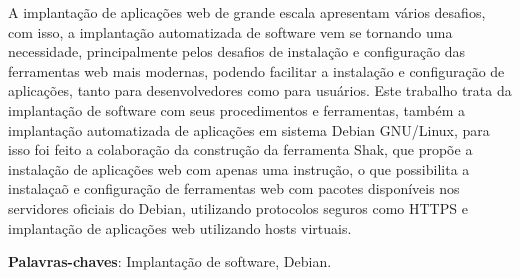 \begin{resumo}

A implantação de aplicações web de grande escala apresentam vários desafios, com
isso, a implantação automatizada de software vem se tornando uma necessidade,
principalmente pelos desafios de instalação e configuração das ferramentas web
mais modernas, podendo facilitar a instalação e configuração de aplicações, tanto para
desenvolvedores como para usuários. Este trabalho trata da implantação de software
com seus procedimentos e ferramentas, também a implantação  automatizada de
aplicações em sistema Debian GNU/Linux, para isso foi feito a colaboração da
construção da ferramenta Shak, que propõe a instalação de aplicações web com
apenas uma instrução, o que possibilita a instalaçaõ e configuração de ferramentas
web com pacotes disponíveis nos servidores oficiais do Debian, utilizando
protocolos seguros como HTTPS e implantação de aplicações web utilizando hosts virtuais.
 \vspace{\onelineskip}

 \noindent
 \textbf{Palavras-chaves}: Implantação de software, Debian.
\end{resumo}

